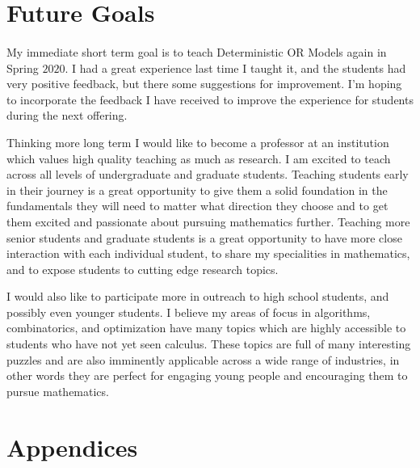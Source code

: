 \documentclass{article}
\begin{document}
\section{Future Goals}

\paragraph{}
My immediate short term goal is to teach Deterministic OR Models again in Spring $2020$. I had a great experience last time I taught it, and the students had very positive feedback, but there some suggestions for improvement. I'm hoping to incorporate the feedback I have received to improve the experience for students during the next offering.

Thinking more long term I would like to become a professor at an institution which values high quality teaching as much as research. I am excited to teach across all levels of undergraduate and graduate students. Teaching students early in their journey is a great opportunity to give them a solid foundation in the fundamentals they will need to matter what direction they choose and to get them excited and passionate about pursuing mathematics further. Teaching more senior students and graduate students is a great opportunity to have more close interaction with each individual student, to share my specialities in mathematics, and to expose students to cutting edge research topics.

I would also like to participate more in outreach to high school students, and possibly even younger students. I believe my areas of focus in algorithms, combinatorics, and optimization have many topics which are highly accessible to students who have not yet seen calculus. These topics are full of many interesting puzzles and are also imminently applicable across a wide range of industries, in other words they are perfect for engaging young people and encouraging them to pursue mathematics.

\appendix
\section*{Appendices}
\end{document}
